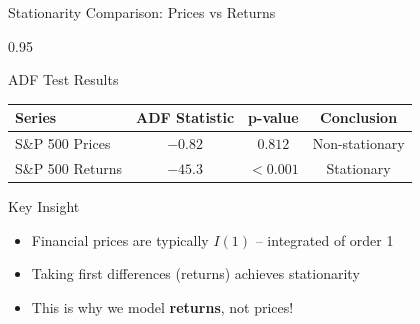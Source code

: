 \documentclass[9pt, aspectratio=169, t]{beamer}
\begin{document}
\begin{frame}{Stationarity Comparison: Prices vs Returns}
    \begin{cminipage}{0.95\textwidth}
    {\small
    \begin{block}{ADF Test Results}
        \begin{center}
        \begin{tabular}{lccc}
            \toprule
            \textbf{Series} & \textbf{ADF Statistic} & \textbf{p-value} & \textbf{Conclusion} \\
            \midrule
            S\&P 500 Prices & $-0.82$ & $0.812$ & Non-stationary \\
            S\&P 500 Returns & $-45.3$ & $<0.001$ & Stationary \\
            \bottomrule
        \end{tabular}
        \end{center}
    \end{block}

    \vspace{0.3cm}

    \begin{exampleblock}{Key Insight}
        \begin{itemize}\setlength{\itemsep}{0pt}
            \item Financial prices are typically $I(1)$ -- integrated of order 1
            \item Taking first differences (returns) achieves stationarity
            \item This is why we model \textbf{returns}, not prices!
        \end{itemize}
    \end{exampleblock}
    }

    \end{cminipage}
\end{frame}
\end{document}
